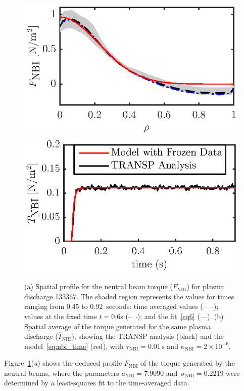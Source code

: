 \documentclass{iopart}
\begin{document}
\begin{figure}
\includegraphics{fig4a} \hspace{-2.7em} \\[-1em] %
\includegraphics{fig4b} \hspace{-2.7em}          %
\caption{(a) Spatial profile for the neutral beam torque ($F_\text{NBI} $) for
  plasma discharge 133367.  The shaded region represents the values for times
  ranging from 0.45 to 0.92~seconds: time averaged values (--~--); values at the
  fixed time $t=0.6$s  (\textcolor{blue}{--~$\cdot$}); and
  the fit~\eqref{eq6} (\textcolor{red}{---}).
  (b) Spatial average of the torque generated for the same plasma discharge
  ($ \overline{T}_\text{NBI}$), showing the TRANSP analysis
  (black) and the model~\eqref{eq:nbi_time} (red),
  with
  $\tau_\text{NBI} = 0.01\,\text{s}$ and  $\kappa_\text{NBI} =
  2\times10^{-6} $.}
\label{fig:Fnbi}
\end{figure}
%
Figure~{\ref{fig:Fnbi}}(\emph{a}) shows the deduced profile $F_\text{NBI}$ of
the torque generated by the neutral beams, where the parameters
$a_\text{NBI}= 7.9090$
and~$\sigma_\text{NBI}= 0.2219$ were determined by a least-squares fit to the
time-averaged data.
\end{document}
